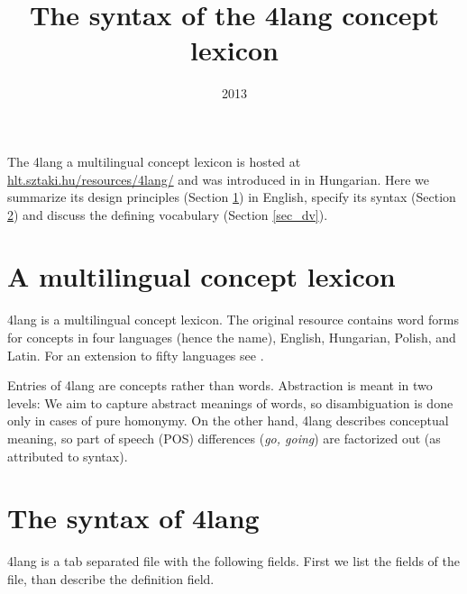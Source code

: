 \documentclass[a4paper,10pt]{article}
\title{The syntax of the 4lang concept lexicon}
\date{2013}
\begin{document}
\maketitle
The 4lang a multilingual concept lexicon is hosted at \url{hlt.sztaki.hu/resources/4lang/} and was introduced in \cite{Kornai:2013} in Hungarian. Here we summarize its design principles (Section \ref{sec_principles}) in English, specify its syntax (Section \ref{sec_synt}) and discuss the defining vocabulary (Section \ref{sec_dv}).
\section{A multilingual concept lexicon}\label{sec_principles}
4lang is a multilingual concept lexicon. The original resource contains word forms for concepts in four languages (hence the name), English, Hungarian, Polish, and Latin. For an extension to fifty languages see \cite{A1cs:2013}.

Entries of 4lang are concepts rather than words. Abstraction is meant in two levels: We aim to capture abstract meanings of words, so disambiguation is done only in cases of pure homonymy. On the other hand, 4lang describes conceptual meaning, so part of speech (POS) differences (\emph{go, going}) are factorized out (as attributed to syntax).
\section{The syntax of 4lang}\label{sec_synt}
4lang is a tab separated file with the following fields. First we list the fields of the file, than describe the definition field.
\end{document}
